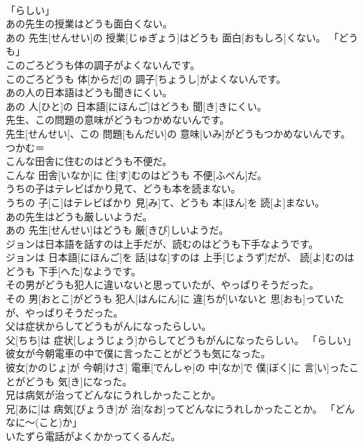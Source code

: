 \documentclass[8pt]{extreport}
\begin{document}
\begin{CJK}{UTF8}{min}
\\	「らしい」
\\	あの先生の授業はどうも面白くない。	
\\	あの 先生[せんせい]の 授業[じゅぎょう]はどうも 面白[おもしろ]くない。	「どうも」
\\	このごろどうも体の調子がよくないんです。	
\\	このごろどうも 体[からだ]の 調子[ちょうし]がよくないんです。	
\\	あの人の日本語はどうも聞きにくい。	
\\	あの 人[ひと]の 日本語[にほんご]はどうも 聞[き]きにくい。	
\\	先生、この問題の意味がどうもつかめないんです。	
\\	先生[せんせい]、この 問題[もんだい]の 意味[いみ]がどうもつかめないんです。	つかむ＝ 
\\	こんな田舎に住むのはどうも不便だ。	
\\	こんな 田舎[いなか]に 住[す]むのはどうも 不便[ふべん]だ。	
\\	うちの子はテレビばかり見て、どうも本を読まない。	
\\	うちの 子[こ]はテレビばかり 見[み]て、どうも 本[ほん]を 読[よ]まない。	
\\	あの先生はどうも厳しいようだ。	
\\	あの 先生[せんせい]はどうも 厳[きび]しいようだ。	
\\	ジョンは日本語を話すのは上手だが、読むのはどうも下手なようです。	
\\	ジョンは 日本語[にほんご]を 話[はな]すのは 上手[じょうず]だが、 読[よ]むのはどうも 下手[へた]なようです。	
\\	その男がどうも犯人に違いないと思っていたが、やっぱりそうだった。	
\\	その 男[おとこ]がどうも 犯人[はんにん]に 違[ちが]いないと 思[おも]っていたが、やっぱりそうだった。	
\\	父は症状からしてどうもがんになったらしい。	
\\	父[ちち]は 症状[しょうじょう]からしてどうもがんになったらしい。	「らしい」
\\	彼女が今朝電車の中で僕に言ったことがどうも気になった。	
\\	彼女[かのじょ]が 今朝[けさ] 電車[でんしゃ]の 中[なか]で 僕[ぼく]に 言[い]ったことがどうも 気[き]になった。	
\\	兄は病気が治ってどんなにうれしかったことか。	
\\	兄[あに]は 病気[びょうき]が 治[なお]ってどんなにうれしかったことか。	「どんなに〜(こと)か」
\\	いたずら電話がよくかかってくるんだ。	

\end{CJK}
\end{document}
